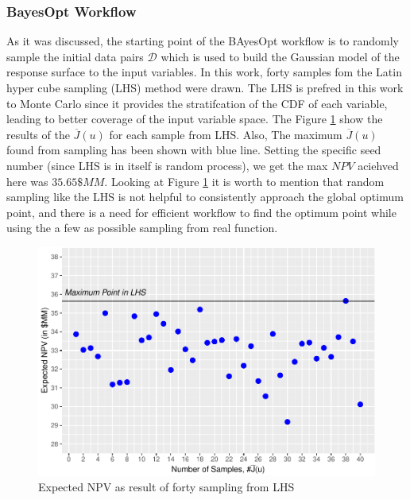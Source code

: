 \documentclass[]{elsarticle} %
\begin{document}
\hypertarget{bayesopt-workflow}{%
\subsubsection{BayesOpt Workflow}\label{bayesopt-workflow}}

As it was discussed, the starting point of the BAyesOpt workflow is to randomly sample the initial data pairs \(\mathcal{D}\) which is used to build the Gaussian model of the response surface to the input variables. In this work, forty samples fom the Latin hyper cube sampling (LHS) method were drawn. The LHS is prefred in this work to Monte Carlo since it provides the stratifcation of the CDF of each variable, leading to better coverage of the input variable space. The Figure \ref{fig:lhssampling} show the results of the \(\overline{J}(u)\) for each sample from LHS. Also, The maximum \(\overline{J}(u)\) found from sampling has been shown with blue line. Setting the specific seed number (since LHS is in itself is random process), we get the max \(NPV\) aciehved here was \(35.65 \$MM\). Looking at Figure \ref{fig:lhssampling} it is worth to mention that random sampling like the LHS is not helpful to consistently approach the global optimum point, and there is a need for efficient workflow to find the optimum point while using the a few as possible sampling from real function.

\begin{figure}

{\centering \includegraphics[width=468px]{0_Paper1_main_files/figure-latex/lhssampling-1} 

}

\caption{Expected NPV as result of forty sampling from LHS}\label{fig:lhssampling}
\end{figure}
\end{document}
